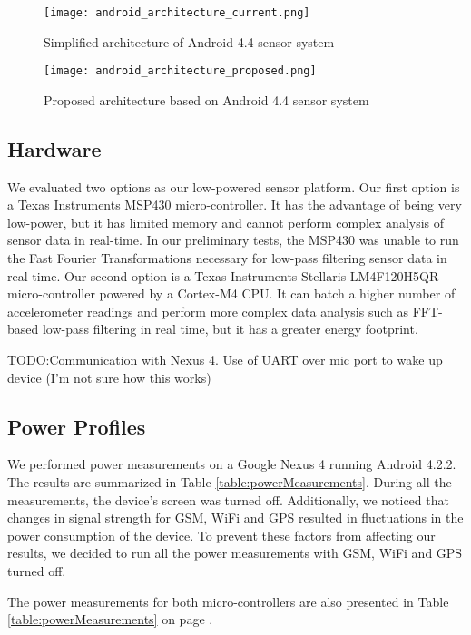 \begin{figure}[h]
	\texttt{[image: android\_architecture\_current.png]}
	\caption{Simplified architecture of Android 4.4 sensor system}
    \label{fig:androidArchCurrent}
\end{figure}

\begin{figure}[h]
	\texttt{[image: android\_architecture\_proposed.png]}
	\caption{Proposed architecture based on Android 4.4 sensor system}
    \label{fig:androidArchProposed}
\end{figure}
 
\subsection{Hardware}

We evaluated two options as our low-powered sensor platform. Our first option is a Texas Instruments MSP430 micro-controller. It has the advantage of being very low-power, but it has limited memory and cannot perform complex analysis of sensor data in real-time. In our preliminary tests, the MSP430 was unable to run the Fast Fourier Transformations necessary for low-pass filtering sensor data in real-time. Our second option is a Texas Instruments Stellaris LM4F120H5QR micro-controller powered by a Cortex-M4 CPU. It can batch a higher number of accelerometer readings and perform more complex data analysis such as FFT-based low-pass filtering in real time, but it has a greater energy footprint.

TODO:Communication with Nexus 4. Use of UART over mic port to wake up device (I'm not sure how this works)

\subsection{Power Profiles} \label{subsec:powerProfiles}

We performed power measurements on a Google Nexus 4 running Android 4.2.2. The results are summarized in Table \ref{table:powerMeasurements}. During all the measurements, the device's screen was turned off. Additionally, we noticed that changes in signal strength for GSM, WiFi and GPS resulted in fluctuations in the power consumption of the device. To prevent these factors from affecting our results, we decided to run all the power measurements with GSM, WiFi and GPS turned off.

The power measurements for both micro-controllers are also presented in Table \ref{table:powerMeasurements} on page \pageref{table:powerMeasurements}.

